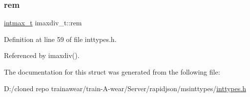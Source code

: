 \subsubsection{\texorpdfstring{rem}{rem}}
{\footnotesize\ttfamily \mbox{\hyperlink{stdint_8h_a036cd61bb4b30bb510b9538af4cebd1d}{intmax\+\_\+t}} imaxdiv\+\_\+t\+::rem}



Definition at line 59 of file inttypes.\+h.



Referenced by imaxdiv().



The documentation for this struct was generated from the following file\+:\begin{DoxyCompactItemize}
\item 
D\+:/cloned repo trainawear/train-\/\+A-\/wear/\+Server/rapidjson/msinttypes/\mbox{\hyperlink{inttypes_8h}{inttypes.\+h}}\end{DoxyCompactItemize}
